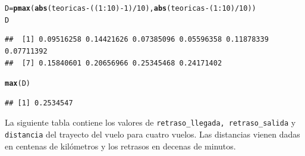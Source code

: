 \documentclass[10pt]{article}\usepackage[]{graphicx}\usepackage[]{color}
\makeatletter
\newcommand{\hlnum}[1]{\textcolor[rgb]{0.686,0.059,0.569}{#1}}%
\newcommand{\hlopt}[1]{\textcolor[rgb]{0,0,0}{#1}}%
\newcommand{\hlstd}[1]{\textcolor[rgb]{0.345,0.345,0.345}{#1}}%
\newcommand{\hlkwb}[1]{\textcolor[rgb]{0.69,0.353,0.396}{#1}}%
\newcommand{\hlkwd}[1]{\textcolor[rgb]{0.737,0.353,0.396}{\textbf{#1}}}%
\newenvironment{kframe}{%
 \def\at@end@of@kframe{}%
 \ifinner\ifhmode%
  \def\at@end@of@kframe{\end{minipage}}%
  \begin{minipage}{\columnwidth}%
 \fi\fi%
 \def\FrameCommand##1{\hskip\@totalleftmargin \hskip-\fboxsep
 \colorbox{shadecolor}{##1}\hskip-\fboxsep
     \hskip-\linewidth \hskip-\@totalleftmargin \hskip\columnwidth}%
 \MakeFramed {\advance\hsize-\width
   \@totalleftmargin\z@ \linewidth\hsize
   \@setminipage}}%
 {\par\unskip\endMakeFramed%
 \at@end@of@kframe}
\newenvironment{knitrout}{}{} %
\newcounter{problemes}
\newcounter{punts} \def\thepunts{\arabic{punts}}
\def\probl{\addtocounter{problemes}{1} \setcounter{punts}{0}
\medskip\noindent{\bf \theproblemes) }}
\makeatother
\begin{document}
\begin{knitrout}
\begin{kframe}
\begin{verbatim}
\end{verbatim}
\begin{alltt}
\hlstd{D}\hlkwb{=}\hlkwd{pmax}\hlstd{(}\hlkwd{abs}\hlstd{(teoricas}\hlopt{-} \hlstd{((}\hlnum{1}\hlopt{:}\hlnum{10}\hlstd{)}\hlopt{-}\hlnum{1}\hlstd{)}\hlopt{/}\hlnum{10}\hlstd{),}\hlkwd{abs}\hlstd{(teoricas}\hlopt{-} \hlstd{(}\hlnum{1}\hlopt{:}\hlnum{10}\hlstd{)}\hlopt{/}\hlnum{10}\hlstd{))}
\hlstd{D}
\end{alltt}
\begin{verbatim}
##  [1] 0.09516258 0.14421626 0.07385096 0.05596358 0.11878339 0.07711392
##  [7] 0.15840601 0.20656966 0.25345468 0.24171402
\end{verbatim}
\begin{alltt}
\hlkwd{max}\hlstd{(D)}
\end{alltt}
\begin{verbatim}
## [1] 0.2534547
\end{verbatim}
\end{kframe}
\end{knitrout}

\probl La siguiente tabla contiene los valores de \verb+retraso_llegada, retraso_salida+ y \verb+distancia+ del trayecto del vuelo para cuatro vuelos. Las distancias vienen dadas en centenas de kilómetros y los retrasos en decenas de minutos. 
\end{document}
